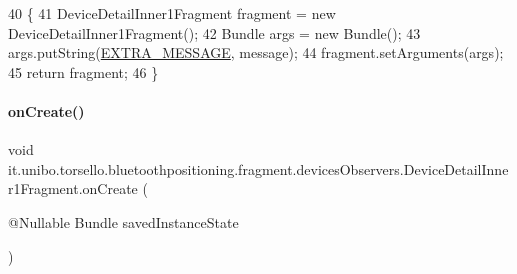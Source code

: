 \begin{DoxyCode}
40                                                                          \{
41         DeviceDetailInner1Fragment fragment = \textcolor{keyword}{new} DeviceDetailInner1Fragment();
42         Bundle args = \textcolor{keyword}{new} Bundle();
43         args.putString(\hyperlink{classit_1_1unibo_1_1torsello_1_1bluetoothpositioning_1_1fragment_1_1devicesObservers_1_1DeviceDetailInner1Fragment_a741715e0af61fb59e24b10e035411cbd_a741715e0af61fb59e24b10e035411cbd}{EXTRA\_MESSAGE}, message);
44         fragment.setArguments(args);
45         \textcolor{keywordflow}{return} fragment;
46     \}
\end{DoxyCode}
\hypertarget{classit_1_1unibo_1_1torsello_1_1bluetoothpositioning_1_1fragment_1_1devicesObservers_1_1DeviceDetailInner1Fragment_aa2c5b397a4773bcd426c4ce3f5e291b4_aa2c5b397a4773bcd426c4ce3f5e291b4}{}\label{classit_1_1unibo_1_1torsello_1_1bluetoothpositioning_1_1fragment_1_1devicesObservers_1_1DeviceDetailInner1Fragment_aa2c5b397a4773bcd426c4ce3f5e291b4_aa2c5b397a4773bcd426c4ce3f5e291b4} 
\paragraph{\texorpdfstring{on\+Create()}{onCreate()}}
{\footnotesize\ttfamily void it.\+unibo.\+torsello.\+bluetoothpositioning.\+fragment.\+devices\+Observers.\+Device\+Detail\+Inner1\+Fragment.\+on\+Create (\begin{DoxyParamCaption}\item[{@Nullable Bundle}]{saved\+Instance\+State }\end{DoxyParamCaption})}


